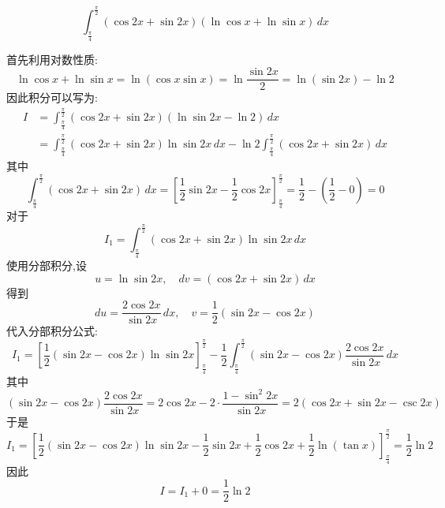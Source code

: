 \begin{questions}

    \question
    \[
    \int_{\frac{\pi}{4}}^{\frac{\pi}{2}} (\cos 2x + \sin 2x)(\ln \cos x + \ln \sin x) \,dx
    \]
    \begin{solution}
        首先利用对数性质:
        \[
        \ln \cos x + \ln \sin x = \ln (\cos x \sin x) = \ln \frac{\sin 2x}{2} = \ln (\sin 2x) - \ln 2
        \]
        因此积分可以写为:
        \begin{align*}
        I&= \int_{\frac{\pi}{4}}^{\frac{\pi}{2}} (\cos 2x + \sin 2x)(\ln \sin 2x - \ln 2) \,dx \\
        &= \int_{\frac{\pi}{4}}^{\frac{\pi}{2}} (\cos 2x + \sin 2x)\ln \sin 2x \,dx - \ln 2 \int_{\frac{\pi}{4}}^{\frac{\pi}{2}} (\cos 2x + \sin 2x) \,dx
        \end{align*}
        其中
        \[
        \int_{\frac{\pi}{4}}^{\frac{\pi}{2}} (\cos 2x + \sin 2x) \,dx = \left[ \frac{1}{2}\sin 2x - \frac{1}{2}\cos 2x \right]_{\frac{\pi}{4}}^{\frac{\pi}{2}} = \frac{1}{2} - \left(\frac{1}{2} - 0\right) = 0
        \]
        对于
        \[
        I_1=\int_{\frac{\pi}{4}}^{\frac{\pi}{2}} (\cos 2x + \sin 2x) \ln \sin 2x \,dx
        \]
        使用分部积分,设
        \[
        u = \ln \sin 2x, \quad dv = (\cos 2x + \sin 2x) \,dx
        \]
        得到
        \[
        du = \frac{2\cos 2x}{\sin 2x} \,dx, \quad v = \frac{1}{2}(\sin 2x - \cos 2x)
        \]
        代入分部积分公式:
        \[
        I_1= \left[\frac{1}{2} (\sin 2x - \cos 2x) \ln \sin 2x\right]_{\frac{\pi}{4}}^{\frac{\pi}{2}} - \frac{1}{2} \int_{\frac{\pi}{4}}^{\frac{\pi}{2}} (\sin 2x - \cos 2x) \frac{2\cos 2x}{\sin 2x} \,dx 
        \]
        其中
        \[
        (\sin 2x - \cos 2x) \frac{2\cos 2x}{\sin 2x} = 2 \cos 2x - 2 \cdot \frac{1-\sin^2 2x}{\sin 2x} = 2 (\cos 2x + \sin 2x - \csc 2x)
        \]
        于是
        \[
        I_1 = \left[ \frac{1}{2}(\sin 2x - \cos 2x) \ln \sin 2x - \frac{1}{2}\sin 2x + \frac{1}{2}\cos 2x + \frac{1}{2} \ln (\tan x) \right]_{\frac{\pi}{4}}^{\frac{\pi}{2}} = \frac{1}{2} \ln 2
        \]
        因此
        \[
        I = I_1 + 0 = \frac{1}{2} \ln 2
        \]
    \end{solution}


\end{questions}
